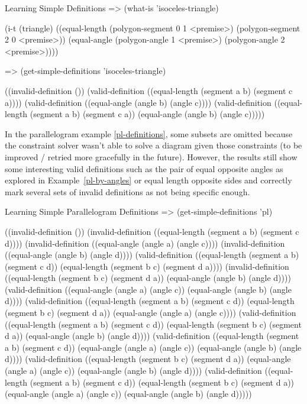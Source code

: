 \begin{repl-example}
[label=simple-definitions]
{Learning Simple Definitions}
=> (what-is 'isoceles-triangle)

(i-t
 (triangle)
 ((equal-length (polygon-segment 0 1 <premise>)
                (polygon-segment 2 0 <premise>))
  (equal-angle (polygon-angle 1 <premise>) (polygon-angle 2 <premise>))))

=> (get-simple-definitions 'isoceles-triangle)

((invalid-definition ())
 (valid-definition
  ((equal-length (segment a b) (segment c a))))
 (valid-definition
  ((equal-angle (angle b) (angle c))))
 (valid-definition
  ((equal-length (segment a b) (segment c a))
   (equal-angle (angle b) (angle c)))))
\end{repl-example}

In the parallelogram example \ref{pl-definitions}, some subsets are
omitted because the constraint solver wasn't able to solve a diagram
given those constraints (to be improved / retried more gracefully in
the future). However, the results still show some interesting valid
definitions such as the pair of equal opposite angles as explored in
Example~\ref{pl-by-angles} or equal length opposite sides and
correctly mark several sets of invalid definitions as not being
specific enough.

\begin{repl-example}
[label=pl-definitions]
{Learning Simple Parallelogram Definitions}
=> (get-simple-definitions 'pl)

((invalid-definition ())
 (invalid-definition ((equal-length (segment a b) (segment c d))))
 (invalid-definition ((equal-angle (angle a) (angle c))))
 (invalid-definition ((equal-angle (angle b) (angle d))))
 (valid-definition
  ((equal-length (segment a b) (segment c d))
   (equal-length (segment b c) (segment d a))))
 (invalid-definition
  ((equal-length (segment b c) (segment d a))
   (equal-angle (angle b) (angle d))))
 (valid-definition
  ((equal-angle (angle a) (angle c))
   (equal-angle (angle b) (angle d))))
 (valid-definition
  ((equal-length (segment a b) (segment c d))
   (equal-length (segment b c) (segment d a))
   (equal-angle (angle a) (angle c))))
 (valid-definition
  ((equal-length (segment a b) (segment c d))
   (equal-length (segment b c) (segment d a))
   (equal-angle (angle b) (angle d))))
 (valid-definition
  ((equal-length (segment a b) (segment c d))
   (equal-angle (angle a) (angle c))
   (equal-angle (angle b) (angle d))))
 (valid-definition
  ((equal-length (segment b c) (segment d a))
   (equal-angle (angle a) (angle c))
   (equal-angle (angle b) (angle d))))
 (valid-definition
  ((equal-length (segment a b) (segment c d))
   (equal-length (segment b c) (segment d a))
   (equal-angle (angle a) (angle c))
   (equal-angle (angle b) (angle d)))))
\end{repl-example}


